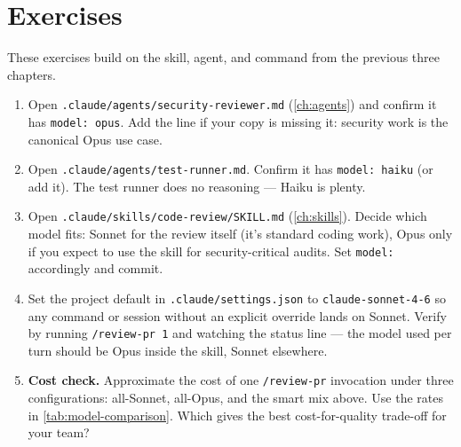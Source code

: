 \section{Exercises}
\label{sec:model-exercises}

\begin{exercisebox}
These exercises build on the skill, agent, and command from the previous
three chapters.

\begin{enumerate}
  \item Open \texttt{.claude/agents/security-reviewer.md}
        (\cref{ch:agents}) and confirm it has \texttt{model: opus}.
        Add the line if your copy is missing it: security work is the
        canonical Opus use case.
  \item Open \texttt{.claude/agents/test-runner.md}. Confirm it has
        \texttt{model: haiku} (or add it). The test runner does no
        reasoning — Haiku is plenty.
  \item Open \texttt{.claude/skills/code-review/SKILL.md}
        (\cref{ch:skills}). Decide which model fits: Sonnet for the
        review itself (it's standard coding work), Opus only if you
        expect to use the skill for security-critical audits. Set
        \texttt{model:} accordingly and commit.
  \item Set the project default in \texttt{.claude/settings.json} to
        \texttt{claude-sonnet-4-6} so any command or session without an
        explicit override lands on Sonnet. Verify by running
        \texttt{/review-pr 1} and watching the status line — the model
        used per turn should be Opus inside the skill, Sonnet elsewhere.
  \item \textbf{Cost check.} Approximate the cost of one
        \texttt{/review-pr} invocation under three configurations:
        all-Sonnet, all-Opus, and the smart mix above. Use the rates in
        \cref{tab:model-comparison}. Which gives the best
        cost-for-quality trade-off for your team?
\end{enumerate}
\end{exercisebox}

